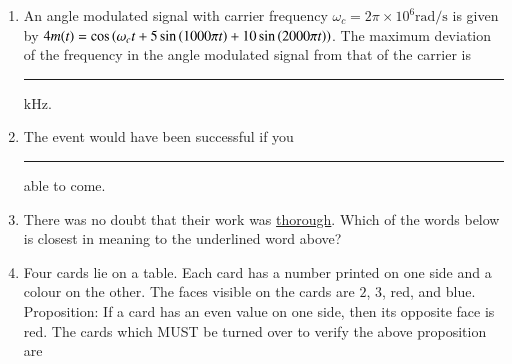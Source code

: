 \documentclass[journal,12pt,onecolumn]{IEEEtran}
\theoremstyle{remark}
\begin{document}
\begin{enumerate}
\item An angle modulated signal with carrier frequency $\omega_c = 2\pi \times10^6\text{rad/s}$ is given by  
$4m(t) = \cos\left(\omega_c t + 5 \sin\left(1000\pi t\right) + 10 \sin\left(2000 \pi t\right)\right)$.  
The maximum deviation of the frequency in the angle modulated signal from that of the carrier is \rule{1.5cm}{0.4pt} $\text{kHz}$. \par \hfill{}

\item The event would have been successful if you \rule{1.5cm}{0.4pt} able to come. \par \hfill{}
\begin{enumerate}
\end{enumerate}

\item There was no doubt that their work was \underline{thorough}.  
Which of the words below is closest in meaning to the underlined word above? \par \hfill{}
\begin{enumerate}
\end{enumerate}

\item Four cards lie on a table. Each card has a number printed on one side and a colour on the other. The faces visible on the cards are $2$, $3$, red, and blue. 
Proposition: If a card has an even value on one side, then its opposite face is red.  
The cards which MUST be turned over to verify the above proposition are \par \hfill{}
\begin{enumerate}
\end{enumerate}


\end{enumerate}
\end{document}
